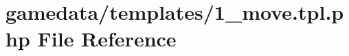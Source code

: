 \hypertarget{1__move_8tpl_8php}{\section{gamedata/templates/1\+\_\+move.tpl.\+php File Reference}
\label{1__move_8tpl_8php}
}

